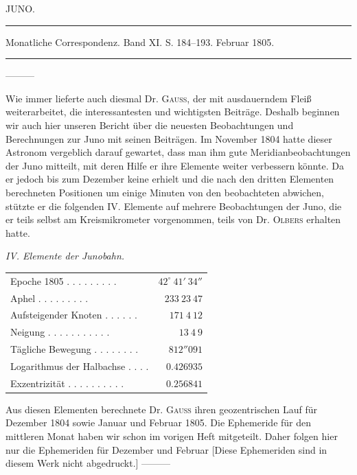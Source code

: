 \clearpage
{}
\hypertarget{native-265-lower}{}
\begin{center}
JUNO.

\rule{0.6\linewidth}{0.4pt}

Monatliche Correspondenz. Band XI. S. 184–193. Februar 1805.

\rule{0.6\linewidth}{0.4pt}
\end{center}

—\quad—\quad—

Wie immer lieferte auch diesmal Dr. \textsc{Gauss}, der mit ausdauerndem Fleiß weiterarbeitet, die interessantesten und wichtigsten Beiträge. Deshalb beginnen wir auch hier unseren Bericht über die neuesten Beobachtungen und Berechnungen zur Juno mit seinen Beiträgen. Im November 1804 hatte dieser Astronom vergeblich darauf gewartet, dass man ihm gute Meridianbeobachtungen der Juno mitteilt, mit deren Hilfe er ihre Elemente weiter verbessern könnte. Da er jedoch bis zum Dezember keine erhielt und die nach den dritten Elementen berechneten Positionen um einige Minuten von den beobachteten abwichen, stützte er die folgenden IV. Elemente auf mehrere Beobachtungen der Juno, die er teils selbst am Kreismikrometer vorgenommen, teils von Dr. \textsc{Olbers} erhalten hatte.

\begin{center}
\emph{IV. Elemente der Junobahn.}
\end{center}

\begin{center}
\begingroup\fontsize{9}{11}\selectfont\setlength{\tabcolsep}{3pt}\renewcommand{\arraystretch}{1.1}
\begin{tabular}{lr}
Epoche 1805 . . . . . . . . . & $42^\circ\ 41'\ 34''$ \\
Aphel . . . . . . . . . & $233\ 23\ 47$ \\
Aufsteigender Knoten . . . . . . & $171\ 4\ 12$ \\
Neigung . . . . . . . . . . . & $13\ 4\ 9$ \\
Tägliche Bewegung . . . . . . . . & $812''091$ \\
Logarithmus der Halbachse . . . . & $0.426935$ \\
Exzentrizität . . . . . . . . . . & $0.256841$ \\
\end{tabular}\endgroup
\end{center}

\indent Aus diesen Elementen berechnete Dr. \textsc{Gauss} ihren geozentrischen Lauf für Dezember 1804 sowie Januar und Februar 1805. Die Ephemeride für den mittleren Monat haben wir schon im vorigen Heft mitgeteilt. Daher folgen hier nur die Ephemeriden für Dezember und Februar [Diese Ephemeriden sind in diesem Werk nicht abgedruckt.] —\quad—\quad—

